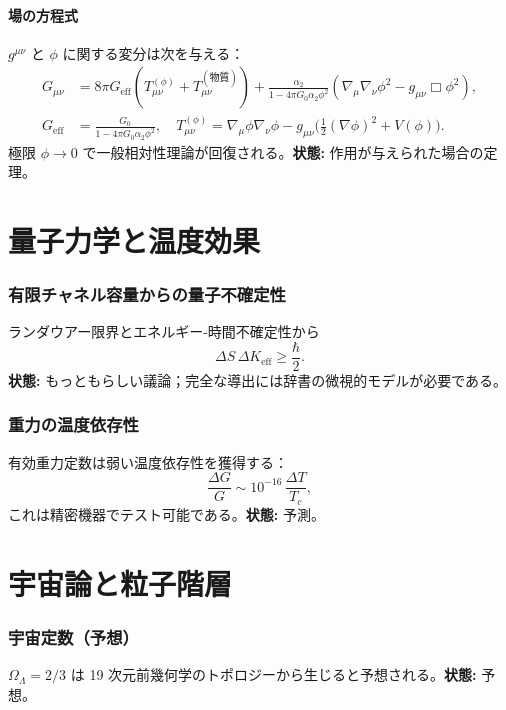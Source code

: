 \documentclass[11pt,a4paper]{article}
\begin{document}
	\subsection{場の方程式}
	\(g^{\mu\nu}\) と \(\phi\) に関する変分は次を与える：
	\begin{align}
		G_{\mu\nu} &= 8\pi G_{\mathrm{eff}}\left(T_{\mu\nu}^{(\phi)} + T_{\mu\nu}^{(\text{物質})}\right) + \frac{\alpha_2}{1-4\pi G_0\alpha_2\phi^2}\left(\nabla_\mu\nabla_\nu\phi^2 - g_{\mu\nu}\Box\phi^2\right), \label{eq:einstein-mod} \\
		G_{\mathrm{eff}} &= \frac{G_0}{1-4\pi G_0\alpha_2\phi^2},\quad
		T_{\mu\nu}^{(\phi)} = \nabla_\mu\phi\nabla_\nu\phi - g_{\mu\nu}\bigl(\tfrac12(\nabla\phi)^2 + V(\phi)\bigr).
	\end{align}
	極限 \(\phi\to0\) で一般相対性理論が回復される。\textbf{状態:} 作用が与えられた場合の定理。
	
	\part{量子力学と温度効果}
	
	\section{有限チャネル容量からの量子不確定性}
	ランダウアー限界とエネルギー-時間不確定性から
	\[
	\Delta S \, \Delta K_{\mathrm{eff}} \ge \frac{\hbar}{2}.
	\]
	\textbf{状態:} もっともらしい議論；完全な導出には辞書の微視的モデルが必要である。
	
	\section{重力の温度依存性}
	\label{sec:temperature}
	有効重力定数は弱い温度依存性を獲得する：
	\[
	\frac{\Delta G}{G} \sim 10^{-16}\,\frac{\Delta T}{T_c},
	\]
	これは精密機器でテスト可能である。\textbf{状態:} 予測。
	
	\part{宇宙論と粒子階層}
	
	\section{宇宙定数（予想）}
	\label{sec:Lambda}
	\(\Omega_\Lambda = 2/3\) は 19 次元前幾何学のトポロジーから生じると予想される。\textbf{状態:} 予想。
	
\end{document}
